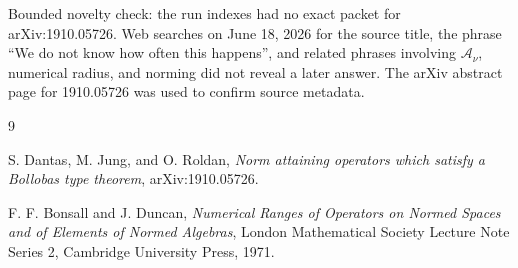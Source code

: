 \documentclass[11pt]{article}
\newcommand{\Anu}{\mathcal A_{\nu}}
\begin{document}
Bounded novelty check: the run indexes had no exact packet for arXiv:1910.05726. Web searches on June 18, 2026 for the source title, the phrase ``We do not know how often this happens'', and related phrases involving \(\Anu\), numerical radius, and norming did not reveal a later answer. The arXiv abstract page for 1910.05726 was used to confirm source metadata.

\begin{thebibliography}{9}

S. Dantas, M. Jung, and O. Roldan,
\emph{Norm attaining operators which satisfy a Bollobas type theorem},
arXiv:1910.05726.

F. F. Bonsall and J. Duncan,
\emph{Numerical Ranges of Operators on Normed Spaces and of Elements of Normed Algebras},
London Mathematical Society Lecture Note Series 2, Cambridge University Press, 1971.

\end{thebibliography}
\end{document}
